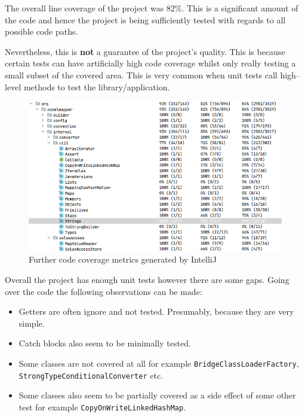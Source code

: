 \documentclass[12pt]{article}
\begin{document}
The overall line coverage of the project was $82\%$. This is a
significant amount of the code and hence the project is being
sufficiently tested with regards to all possible code paths.

Nevertheless, this is \textbf{not} a guarantee of the project's
quality. This is because certain tests can have artificially
high code coverage whilst only really testing a small subset of
the covered area. This is very common when unit tests call
high--level methods to test the library/application.

\begin{figure}[H]
    \centering
    \includegraphics[width=14cm]{images/code-coverage-2.png}
    \caption{Further code coverage metrics generated by IntelliJ}
    \label{intellij-code-coverage-2}
\end{figure}

Overall the project has enough unit tests however there are
some gaps. Going over the code the following observations can be
made:

\begin{itemize}
    \item Getters are often ignore and not tested. Presumably,
        because they are very simple.
    \item Catch blocks also seem to be minimally tested.
    \item Some classes are not covered at all for example
        \texttt{BridgeClassLoaderFactory}, \linebreak
        \texttt{StrongTypeConditionalConverter} etc.
    \item Some classes also seem to be partially covered as a side
        effect of some other test for example
        \texttt{CopyOnWriteLinkedHashMap}.
\end{itemize}
\end{document}
